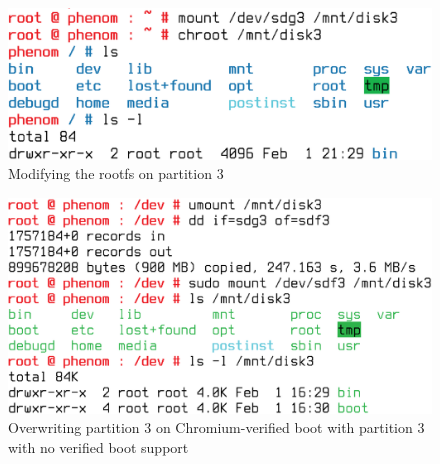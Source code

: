 \documentclass[11pt]{article}
\begin{document}
\begin{enumerate}
\begin{itemize}
\begin{figure}[htbp]
  \centering
    \includegraphics[scale=.25]{Figure/part3-noverify-chroot.eps}
\caption{\small{Modifying the rootfs on partition 3}}
\label{fig:part3-noverify-chroot}
\end{figure}
\end{itemize}


\begin{figure}[htbp]
  \centering
    \includegraphics[scale=.25]{Figure/verified-overwrite-by-noverify.eps}
\caption{\small{Overwriting partition 3 on Chromium-verified boot with partition 3 with no verified boot support}}
\label{fig:verified-overwrite-by-noverify}
\end{figure}


\end{enumerate}
\end{document}
